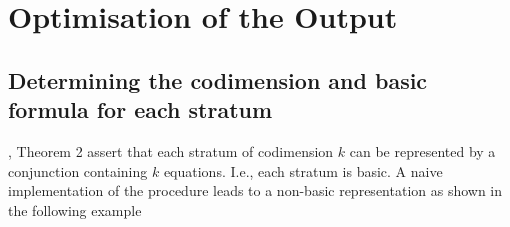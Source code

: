 \documentclass[
]{book}
\theoremstyle{definition}
\theoremstyle{definition}
\theoremstyle{definition}
\theoremstyle{definition}
\theoremstyle{remark}
\begin{document}
\hypertarget{optimisation-of-the-output}{%
\section{Optimisation of the Output}\label{optimisation-of-the-output}}

\hypertarget{determining-the-codimension-and-basic-formula-for-each-stratum}{%
\subsection{Determining the codimension and basic formula for each stratum}\label{determining-the-codimension-and-basic-formula-for-each-stratum}}

\citet{gv1995}, Theorem 2 assert that each stratum of codimension \(k\) can be represented by a conjunction containing \(k\) equations. I.e., each stratum is basic. A naive implementation of the procedure leads to a non-basic representation as shown in the following example
\end{document}
